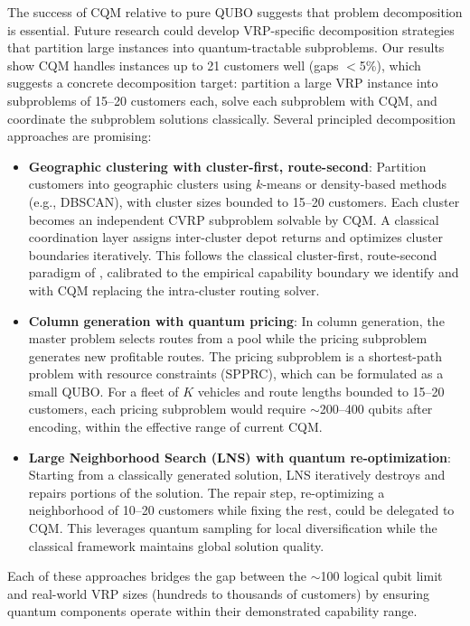 \documentclass[preprint,3p,12pt,authoryear]{elsarticle}
\begin{document}
\begin{enumerate}

{\color{red}\item The success of CQM relative to pure QUBO suggests that problem decomposition is essential. Future research could develop VRP-specific decomposition strategies that partition large instances into quantum-tractable subproblems. Our results show CQM handles instances up to 21 customers well (gaps $<$5\%), which suggests a concrete decomposition target: partition a large VRP instance into subproblems of 15--20 customers each, solve each subproblem with CQM, and coordinate the subproblem solutions classically. Several principled decomposition approaches are promising:
\begin{itemize}
\item \textbf{Geographic clustering with cluster-first, route-second}: Partition customers into geographic clusters using $k$-means or density-based methods (e.g., DBSCAN), with cluster sizes bounded to 15--20 customers. Each cluster becomes an independent CVRP subproblem solvable by CQM. A classical coordination layer assigns inter-cluster depot returns and optimizes cluster boundaries iteratively. This follows the classical cluster-first, route-second paradigm of \citet{fisher1981generalized}, calibrated to the empirical capability boundary we identify and with CQM replacing the intra-cluster routing solver.
\item \textbf{Column generation with quantum pricing}: In column generation, the master problem selects routes from a pool while the pricing subproblem generates new profitable routes. The pricing subproblem is a shortest-path problem with resource constraints (SPPRC), which can be formulated as a small QUBO. For a fleet of $K$ vehicles and route lengths bounded to 15--20 customers, each pricing subproblem would require $\sim$200--400 qubits after encoding, within the effective range of current CQM.
\item \textbf{Large Neighborhood Search (LNS) with quantum re-optimization}: Starting from a classically generated solution, LNS iteratively destroys and repairs portions of the solution. The repair step, re-optimizing a neighborhood of 10--20 customers while fixing the rest, could be delegated to CQM. This leverages quantum sampling for local diversification while the classical framework maintains global solution quality.
\end{itemize}
Each of these approaches bridges the gap between the $\sim$100 logical qubit limit and real-world VRP sizes (hundreds to thousands of customers) by ensuring quantum components operate within their demonstrated capability range.}


\end{enumerate}
\end{document}

